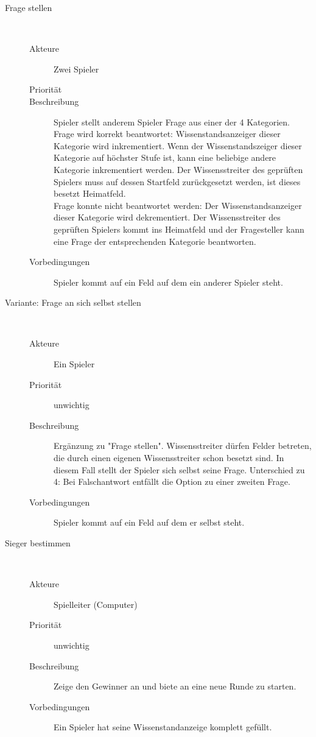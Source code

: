 \documentclass{scrartcl} %
\begin{document}
\begin{description}
   \item[Frage stellen]~\par
   \begin{description}
      \item[Akteure] Zwei Spieler
      \item[Priorität]
      \item[Beschreibung] Spieler stellt anderem Spieler Frage aus einer der 4 Kategorien.\\
Frage wird korrekt beantwortet: Wissenstandsanzeiger dieser Kategorie wird inkrementiert. Wenn der Wissenstandszeiger dieser Kategorie auf höchster Stufe ist, kann eine beliebige andere Kategorie inkrementiert werden. Der Wissensstreiter des geprüften Spielers muss auf dessen Startfeld zurückgesetzt werden, ist dieses besetzt Heimatfeld.\\
Frage konnte nicht beantwortet werden: Der Wissenstandsanzeiger dieser Kategorie wird dekrementiert. Der Wissensstreiter des geprüften Spielers kommt ins Heimatfeld und der Fragesteller kann eine Frage der entsprechenden Kategorie beantworten.
      \item[Vorbedingungen] Spieler kommt auf ein Feld auf dem ein anderer Spieler steht.
   \end{description}
   

   \item[Variante: Frage an sich selbst stellen]~\par
   \begin{description}
      \item[Akteure] Ein Spieler
      \item[Priorität] unwichtig
      \item[Beschreibung] Ergänzung zu "Frage stellen". Wissensstreiter dürfen Felder betreten, die durch einen eigenen Wissensstreiter schon besetzt sind. In diesem Fall stellt der Spieler sich selbst seine Frage. Unterschied zu 4: Bei Falschantwort entfällt die Option zu einer zweiten Frage.
      \item[Vorbedingungen] Spieler kommt auf ein Feld auf dem er selbst steht. %
   \end{description}
   

   \item[Sieger bestimmen]~\par
   \begin{description}
      \item[Akteure] Spielleiter (Computer)
      \item[Priorität] unwichtig
      \item[Beschreibung] Zeige den Gewinner an und biete an eine neue Runde zu starten.
      \item[Vorbedingungen] Ein Spieler hat seine Wissenstandanzeige komplett gefüllt.
   \end{description}
\end{description}
\end{document}
